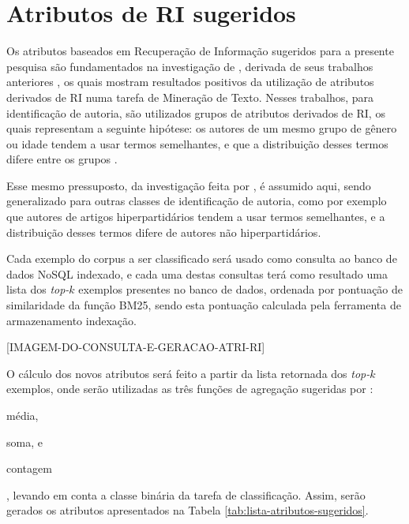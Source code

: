  



\section{Atributos de RI sugeridos}  \label{sec:Atributos-de-RI-sugeridos}
    Os atributos baseados em Recuperação de Informação sugeridos para a presente pesquisa são fundamentados na investigação de , derivada de seus trabalhos anteriores \cite{WEREN_CLEF_2014,WEREN_ARTIGO_2014}, os quais mostram resultados positivos da utilização de atributos derivados de RI numa tarefa de Mineração de Texto.
    Nesses trabalhos, para identificação de autoria, são utilizados grupos de atributos derivados de RI, os quais representam a seguinte hipótese: os autores de um mesmo grupo de gênero ou idade tendem a usar termos semelhantes, e que a distribuição desses termos difere entre os grupos \cite[p.~20]{WEREN_MESTRADO_2014}.
    
    Esse mesmo pressuposto, da investigação feita por , é assumido aqui, sendo generalizado para outras classes de identificação de autoria, como por exemplo que autores de artigos hiperpartidários tendem a usar termos semelhantes, e a distribuição desses termos difere de autores não hiperpartidários.
    
    Cada exemplo do corpus a ser classificado será usado como consulta ao banco de dados NoSQL indexado, e cada uma destas consultas terá como resultado uma lista dos \textit{top-$k$} exemplos presentes no banco de dados, ordenada por pontuação de similaridade da função BM25, sendo esta pontuação calculada pela ferramenta de armazenamento indexação.
    
    [IMAGEM-DO-CONSULTA-E-GERACAO-ATRI-RI]
    
    O cálculo dos novos atributos será feito a partir da lista retornada dos \textit{top-$k$} exemplos, onde serão utilizadas as três funções de agregação sugeridas por :
    \begin{enumerate*}[label=(\alph*)]
        \item média,
        \item soma, e
        \item contagem
    \end{enumerate*}, 
    levando em conta a classe binária da tarefa de classificação. 
    Assim, serão gerados os atributos apresentados na Tabela \ref{tab:lista-atributos-sugeridos}.
    

